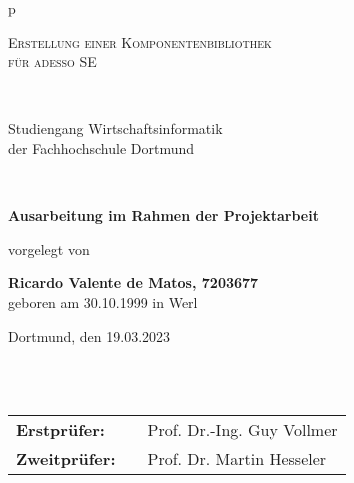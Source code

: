 \begin{center}
\begin{tabular}{p{\textwidth}}

\begin{center}
\LARGE{\textsc{
Erstellung einer Komponentenbibliothek \\
für adesso SE\\
}}
\end{center}

\\


\begin{center}
\large{Studiengang Wirtschaftsinformatik \\
der Fachhochschule Dortmund \\}
\end{center}

\\

\begin{center}
\textbf{\Large{Ausarbeitung im Rahmen der Projektarbeit}}
\end{center}




\begin{center}
vorgelegt von
\end{center}

\begin{center}
\large{\textbf{Ricardo Valente de Matos, 7203677}} \\
\small{geboren am 30.10.1999 in Werl}
\end{center}

\begin{center}
\large{Dortmund, den 19.03.2023}
\end{center}

\\

\\

\begin{center}
\begin{tabular}{lll}
\textbf{Erstprüfer:} & & Prof. Dr.-Ing. Guy Vollmer\\
\textbf{Zweitprüfer:} & & Prof. Dr. Martin Hesseler\\
\end{tabular}
\end{center}

\end{tabular}
\end{center}